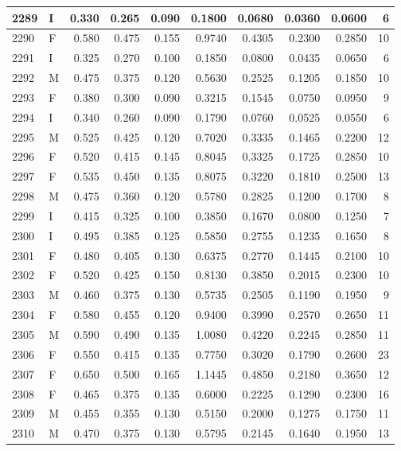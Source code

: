 \documentclass[9pt,twocolumn,twoside,]{pnas-new}
\begin{document}
\begin{tabular}{l|l|r|r|r|r|r|r|r|r}
\hline
2289 & I & 0.330 & 0.265 & 0.090 & 0.1800 & 0.0680 & 0.0360 & 0.0600 & 6\\
\hline
2290 & F & 0.580 & 0.475 & 0.155 & 0.9740 & 0.4305 & 0.2300 & 0.2850 & 10\\
\hline
2291 & I & 0.325 & 0.270 & 0.100 & 0.1850 & 0.0800 & 0.0435 & 0.0650 & 6\\
\hline
2292 & M & 0.475 & 0.375 & 0.120 & 0.5630 & 0.2525 & 0.1205 & 0.1850 & 10\\
\hline
2293 & F & 0.380 & 0.300 & 0.090 & 0.3215 & 0.1545 & 0.0750 & 0.0950 & 9\\
\hline
2294 & I & 0.340 & 0.260 & 0.090 & 0.1790 & 0.0760 & 0.0525 & 0.0550 & 6\\
\hline
2295 & M & 0.525 & 0.425 & 0.120 & 0.7020 & 0.3335 & 0.1465 & 0.2200 & 12\\
\hline
2296 & F & 0.520 & 0.415 & 0.145 & 0.8045 & 0.3325 & 0.1725 & 0.2850 & 10\\
\hline
2297 & F & 0.535 & 0.450 & 0.135 & 0.8075 & 0.3220 & 0.1810 & 0.2500 & 13\\
\hline
2298 & M & 0.475 & 0.360 & 0.120 & 0.5780 & 0.2825 & 0.1200 & 0.1700 & 8\\
\hline
2299 & I & 0.415 & 0.325 & 0.100 & 0.3850 & 0.1670 & 0.0800 & 0.1250 & 7\\
\hline
2300 & I & 0.495 & 0.385 & 0.125 & 0.5850 & 0.2755 & 0.1235 & 0.1650 & 8\\
\hline
2301 & F & 0.480 & 0.405 & 0.130 & 0.6375 & 0.2770 & 0.1445 & 0.2100 & 10\\
\hline
2302 & F & 0.520 & 0.425 & 0.150 & 0.8130 & 0.3850 & 0.2015 & 0.2300 & 10\\
\hline
2303 & M & 0.460 & 0.375 & 0.130 & 0.5735 & 0.2505 & 0.1190 & 0.1950 & 9\\
\hline
2304 & F & 0.580 & 0.455 & 0.120 & 0.9400 & 0.3990 & 0.2570 & 0.2650 & 11\\
\hline
2305 & M & 0.590 & 0.490 & 0.135 & 1.0080 & 0.4220 & 0.2245 & 0.2850 & 11\\
\hline
2306 & F & 0.550 & 0.415 & 0.135 & 0.7750 & 0.3020 & 0.1790 & 0.2600 & 23\\
\hline
2307 & F & 0.650 & 0.500 & 0.165 & 1.1445 & 0.4850 & 0.2180 & 0.3650 & 12\\
\hline
2308 & F & 0.465 & 0.375 & 0.135 & 0.6000 & 0.2225 & 0.1290 & 0.2300 & 16\\
\hline
2309 & M & 0.455 & 0.355 & 0.130 & 0.5150 & 0.2000 & 0.1275 & 0.1750 & 11\\
\hline
2310 & M & 0.470 & 0.375 & 0.130 & 0.5795 & 0.2145 & 0.1640 & 0.1950 & 13\\

\end{tabular}
\end{document}
